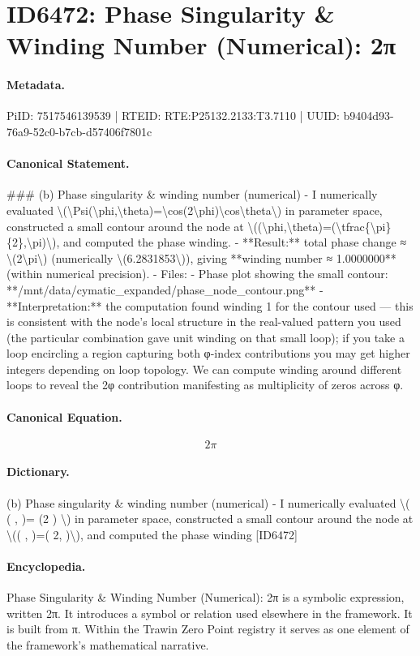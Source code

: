 \section*{ID6472: Phase Singularity \& Winding Number (Numerical): 2π}
\paragraph{Metadata.}
PiID: 7517546139539 | RTEID: RTE:P25132.2133:T3.7110 | UUID: b9404d93-76a9-52c0-b7cb-d57406f7801c

\paragraph{Canonical Statement.}
\#\#\# (b) Phase singularity \& winding number (numerical) - I numerically evaluated \textbackslash{}(\textbackslash{}Psi(\textbackslash{}phi,\textbackslash{}theta)=\textbackslash{}cos(2\textbackslash{}phi)\textbackslash{}cos\textbackslash{}theta\textbackslash{}) in parameter space, constructed a small contour around the node at \textbackslash{}((\textbackslash{}phi,\textbackslash{}theta)=(\textbackslash{}tfrac\{\textbackslash{}pi\}\{2\},\textbackslash{}pi)\textbackslash{}), and computed the phase winding. - **Result:** total phase change ≈ \textbackslash{}(2\textbackslash{}pi\textbackslash{}) (numerically \textbackslash{}(6.2831853\textbackslash{})), giving **winding number ≈ 1.0000000** (within numerical precision). - Files: - Phase plot showing the small contour: **/mnt/data/cymatic\_expanded/phase\_node\_contour.png** - **Interpretation:** the computation found winding 1 for the contour used — this is consistent with the node’s local structure in the real-valued pattern you used (the particular combination gave unit winding on that small loop); if you take a loop encircling a region capturing both φ-index contributions you may get higher integers depending on loop topology. We can compute winding around different loops to reveal the 2φ contribution manifesting as multiplicity of zeros across φ.

\paragraph{Canonical Equation.}
\[
2\pi
\]

\paragraph{Dictionary.}
(b) Phase singularity \& winding number (numerical) - I numerically evaluated \textbackslash{}( ( , )= (2 ) \textbackslash{}) in parameter space, constructed a small contour around the node at \textbackslash{}(( , )=( 2, )\textbackslash{}), and computed the phase winding [ID6472]

\paragraph{Encyclopedia.}
Phase Singularity \& Winding Number (Numerical): 2π is a symbolic expression, written 2π. It introduces a symbol or relation used elsewhere in the framework. It is built from π. Within the Trawin Zero Point registry it serves as one element of the framework's mathematical narrative.
